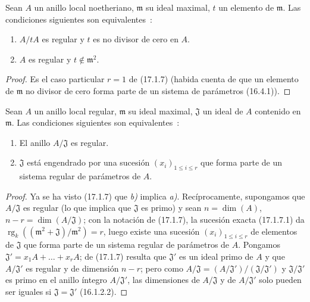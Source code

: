 
\begin{corollary}[17.1.8]
\label{0.17.1.8-es}
Sean $A$ un anillo local noetheriano, $\mathfrak{m}$ su ideal maximal, $t$ un
elemento de $\mathfrak{m}$. Las condiciones siguientes son equivalentes~:
\begin{enumerate}
  \item[\rm a)] $A/tA$ es regular y $t$ es no divisor de cero en $A$.
  \item[\rm b)] $A$ es regular y $t\notin\mathfrak{m}^2$.
\end{enumerate}
\end{corollary}

\begin{proof}
Es el caso particular $r=1$ de (17.1.7) (habida cuenta de que un elemento de
$\mathfrak{m}$ no divisor de cero forma parte de un sistema de parámetros
(16.4.1)).
\end{proof}

\begin{corollary}[17.1.9]
\label{0.17.1.9-es}
Sean $A$ un anillo local regular, $\mathfrak{m}$ su ideal maximal,
$\mathfrak{J}$ un ideal de $A$ contenido en $\mathfrak{m}$. Las condiciones
siguientes son equivalentes~:
\begin{enumerate}
  \item[\rm a)] El anillo $A/\mathfrak{J}$ es regular.
  \item[\rm b)] $\mathfrak{J}$ está engendrado por una sucesión
  $(x_i)_{1\leq i\leq r}$ que forma parte de un sistema regular de parámetros
  de $A$.
\end{enumerate}
\end{corollary}

\begin{proof}
Ya se ha visto (17.1.7) que \emph{b)} implica \emph{a)}. Recíprocamente, supongamos que
$A/\mathfrak{J}$ es regular (lo que implica que $\mathfrak{J}$ es primo)
y sean $n=\dim(A)$, $n-r=\dim(A/\mathfrak{J})$; con la notación de
(17.1.7), la sucesión exacta (17.1.7.1) da
$\operatorname{rg}_k((\mathfrak{m}^2+\mathfrak{J})/\mathfrak{m}^2)=r$, luego
existe una sucesión $(x_i)_{1\leq i\leq r}$ de elementos de $\mathfrak{J}$ que
forma parte de un sistema regular de parámetros de $A$. Pongamos
$\mathfrak{J}'=x_1A+\ldots+x_rA$; de (17.1.7) resulta que $\mathfrak{J}'$
es un ideal primo de $A$ y que $A/\mathfrak{J}'$ es regular y de
dimensión $n-r$; pero como
$A/\mathfrak{J}=(A/\mathfrak{J}')/(\mathfrak{J}/\mathfrak{J}')$ y
$\mathfrak{J}/\mathfrak{J}'$ es primo en el anillo íntegro
$A/\mathfrak{J}'$, las dimensiones de $A/\mathfrak{J}$ y de
$A/\mathfrak{J}'$ solo pueden ser iguales si
$\mathfrak{J}=\mathfrak{J}'$ (16.1.2.2).
\end{proof}

